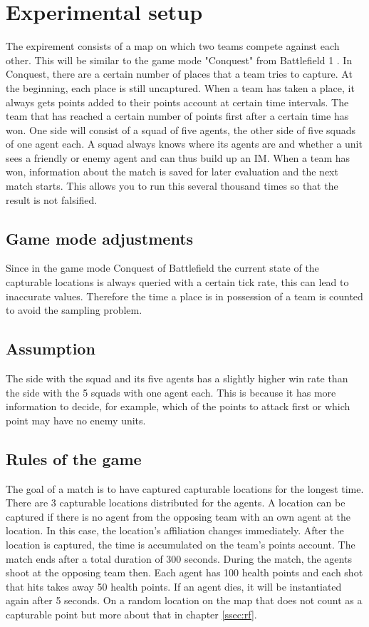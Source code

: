 \documentclass[]{report}
\begin{document}
		\chapter{Experimental setup}
		The expirement consists of a map on which two teams compete against each other. This will be similar to the game mode "Conquest" from Battlefield 1 \citep{battlefield1modes}. In Conquest, there are a certain number of places that a team tries to capture. At the beginning, each place is still uncaptured. When a team has taken a place, it always gets points added to their points account at certain time intervals. The team that has reached a certain number of points first after a certain time has won. 
		One side will consist of a squad of five agents, the other side of five squads of one agent each. A squad always knows where its agents are and whether a unit sees a friendly or enemy agent and can thus build up an \ac{IM}.
		When a team has won, information about the match is saved for later evaluation and the next match starts. This allows you to run this several thousand times so that the result is not falsified.
		
		\section{Game mode adjustments}
		Since in the game mode Conquest of Battlefield \citep{battlefield1modes} the current state of the capturable locations is always queried with a certain tick rate, this can lead to inaccurate values. Therefore the time a place is in possession of a team is counted to avoid the sampling problem.
		
		\section{Assumption}
		The side with the squad and its five agents has a slightly higher win rate than the side with the 5 squads with one agent each. This is because it has more information to decide, for example, which of the points to attack first or which point may have no enemy units. 
		
		\section{Rules of the game}
		The goal of a match is to have captured capturable locations for the longest time. There are 3 capturable locations distributed for the agents. A location can be captured if there is no agent from the opposing team with an own agent at the location. In this case, the location's affiliation changes immediately. After the location is captured, the time is accumulated on the team's points account. The match ends after a total duration of 300 seconds. 
		During the match, the agents shoot at the opposing team then. Each agent has 100 health points and each shot that hits takes away 50 health points. If an agent dies, it will be instantiated again after 5 seconds. On a random location on the map that does not count as a capturable point but more about that in chapter \ref{ssec:rf}. 
		
\end{document}
